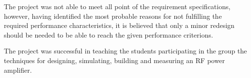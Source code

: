   The project was not able to meet all point of the requirement specifications, however, having identified the most probable reasons for not fulfilling the required performance characteristics, it is believed that only a minor redesign should be needed to be able to reach the given performance criterions.

  The project was successful in teaching the students participating in the group the techniques for designing, simulating, building and measuring an RF power amplifier.
